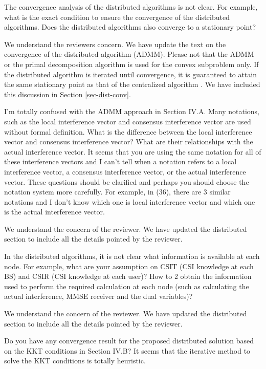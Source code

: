  The convergence analysis of the distributed algorithms is not clear. For example, what is the exact condition to ensure the convergence of the distributed algorithms. Does the distributed algorithms also converge to a stationary point?

\resp We understand the reviewers concern. We have update the text on the convergence of the distributed algorithm (ADMM). Please not that the ADMM or the primal decomposition algorithm is used for the convex subproblem only. If the distributed algorithm is iterated until convergence, it is guaranteed to attain the same stationary point as that of the centralized algorithm \cite{boyd2011distributed}. We have included this discussion in Section \ref{sec-dist-conv}.

 I’m totally confused with the ADMM approach in Section IV.A. Many notations, such as the local interference vector and consensus interference vector are used without formal definition. What is the difference between the local interference vector and consensus interference vector? What are their relationships with the actual interference vector. It seems that you are using the same notation for all of these interference vectors and I can’t tell when a notation refers to a local interference vector, a consensus interference vector, or the actual interference vector. These questions should be clarified and perhaps you should choose the notation system more carefully. For example, in (36), there are 3 similar notations and I don’t know which one is local interference vector and which one is the actual interference vector.

\resp We understand the concern of the reviewer. We have updated the distributed section to include all the details pointed by the reviewer.

 In the distributed algorithms, it is not clear what information is available at each node. For example, what are your assumption on CSIT (CSI knowledge at each BS) and CSIR (CSI knowledge at each user)? How to 2 obtain the information used to perform the required calculation at each node (such as calculating the actual interference, MMSE receiver and the dual variables)?

\resp We understand the concern of the reviewer. We have updated the distributed section to include all the details pointed by the reviewer.

 Do you have any convergence result for the proposed distributed solution based on the KKT conditions in Section IV.B? It seems that the iterative method to solve the KKT conditions is totally heuristic.

